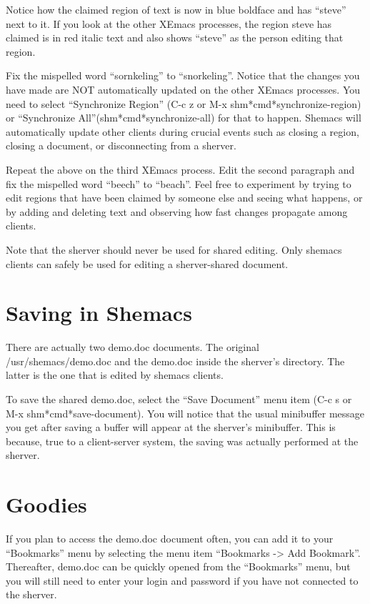 Notice how the claimed region of text is now in blue boldface and has ``steve''
next to it.  If you look at the other XEmacs processes, the region steve has 
claimed is in red italic text and also shows ``steve'' as the person editing 
that region. 

Fix the mispelled word ``sornkeling'' to ``snorkeling''.  Notice that the
changes you have made are NOT automatically updated on the other XEmacs
processes.  You need to select ``Synchronize Region'' (C-c z or M-x
shm*cmd*synchronize-region) or ``Synchronize All''(shm*cmd*synchronize-all)
for that to happen.  Shemacs will automatically update other clients during
crucial events such as closing a region, closing a document, or
disconnecting from a sherver.

Repeat the above on the third XEmacs process.  Edit the second paragraph
and fix the mispelled word ``beech'' to ``beach''.  Feel free to experiment
by trying to edit regions that have been claimed by someone else and seeing
what happens, or by adding and deleting text and observing how fast changes
propagate among clients.

Note that the sherver should never be used for shared editing.  Only shemacs 
clients can safely be used for editing a sherver-shared document.

\section{Saving in Shemacs}

There are actually two demo.doc documents. The original /usr/shemacs/demo.doc 
and the demo.doc inside the sherver's directory. The latter is the one that is 
edited by shemacs clients.

To save the shared demo.doc, select the ``Save Document'' menu item (C-c s
or M-x shm*cmd*save-document).  You will notice that the usual minibuffer
message you get after saving a buffer will appear at the sherver's
minibuffer.  This is because, true to a client-server system, the saving
was actually performed at the sherver.

\section{Goodies}

If you plan to access the demo.doc document often, you can add it to your
``Bookmarks'' menu by selecting the menu item ``Bookmarks -> Add Bookmark''.  
Thereafter, demo.doc can be quickly opened from the ``Bookmarks'' menu, but you 
will still need to enter your login and password if you have not connected to 
the sherver.

